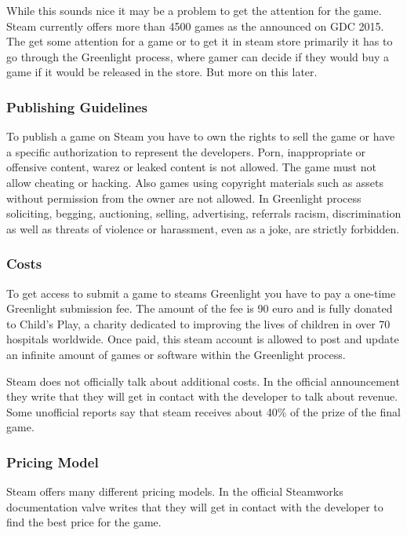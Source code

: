 While this sounds nice it may be a problem to get the attention for the game. Steam currently offers more than 4500 games as the announced on GDC 2015. The get some attention for a game or to get it in steam store primarily it has to go through the Greenlight process, where gamer can decide if they would buy a game if it would be released in the store. But more on this later. \citep{smith_valve_2015}

\subsubsection{Publishing Guidelines}
\label{steam_publishing_guidelines}
To publish a game on Steam you have to own the rights to sell the game or have a specific authorization to represent the developers. Porn, inappropriate or offensive content, warez or leaked content is not allowed. The game must not allow cheating or hacking. Also games using copyright materials such as assets without permission from the owner are not allowed.
In Greenlight process soliciting, begging, auctioning, selling, advertising, referrals racism, discrimination as well as threats of violence or harassment, even as a joke, are strictly forbidden. \citep{valve_steam_2016}


\subsubsection{Costs}
\label{subsec:steam_costs}
To get access to submit a game to steams Greenlight you have to pay a one-time Greenlight submission fee. The amount of the fee is 90 euro and is fully donated to Child's Play, a charity dedicated to improving the lives of children in over 70 hospitals worldwide. Once paid, this steam account is allowed to post and update an infinite amount of games or software within the Greenlight process. \citep{valve_steam_2016}

Steam does not officially talk about additional costs. In the official announcement they write that they will get in contact with the developer to talk about revenue. Some unofficial reports say that steam receives about 40\% of the prize of the final game.

\subsubsection{Pricing Model}
\label{subsec:steam_pricing}
Steam offers many different pricing models. In the official Steamworks documentation valve writes that they will get in contact with the developer to find the best price for the game.

